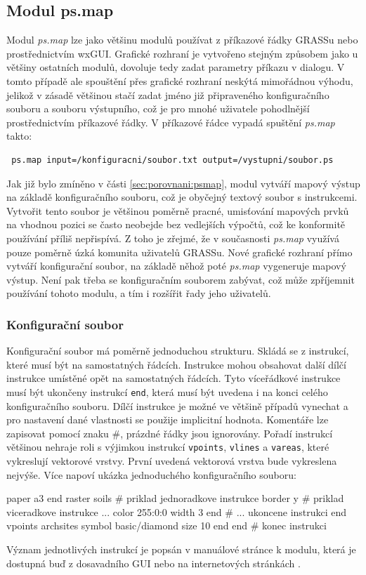 \documentclass[a4paper,12pt,draft]{article}
\newcommand{\modul}[1]{\emph{#1}}
\newcommand{\instr}[1]{\lstinline[style=psmapInline]|#1|}
\begin{document}
\subsection{Modul ps.map}
\label{sec:psmap}
Modul \modul{ps.map} lze jako většinu modulů používat z příkazové řádky GRASSu nebo pro\-střed\-nic\-tvím wxGUI. Grafické rozhraní je vytvořeno stejným způsobem jako u většiny ostatních modulů, dovoluje tedy zadat parametry příkazu v dialogu. V tomto případě ale spouštění přes grafické rozhraní neskýtá mimořádnou výhodu, jelikož v zásadě většinou stačí zadat jméno již připraveného konfiguračního souboru a souboru výstupního, což je pro mnohé uživatele pohodlnější prostřednictvím příkazové řádky. V příkazové řádce vypadá spuštění \modul{ps.map} takto:
\begin{verbatim}
 ps.map input=/konfiguracni/soubor.txt output=/vystupni/soubor.ps   
\end{verbatim}

Jak již bylo zmíněno v části \ref{sec:porovnani:psmap}, modul vytváří mapový výstup na základě konfiguračního souboru, což je obyčejný textový soubor s instrukcemi. Vytvořit tento soubor je většinou poměrně pracné, umisťování mapových prvků na vhodnou pozici se často neobejde bez vedlejších výpočtů, což ke konformitě používání příliš nepřispívá. Z toho je zřejmé, že v současnosti \modul{ps.map} využívá pouze poměrně úzká komunita uživatelů GRASSu. Nové grafické rozhraní přímo vytváří konfigurační soubor, na základě něhož poté \modul{ps.map} vygeneruje mapový výstup. Není pak třeba se konfiguračním souborem zabývat, což může zpříjemnit používání tohoto modulu, a tím i rozšířit řady jeho uživatelů. 

\subsubsection{Konfigurační soubor}
Konfigurační soubor má poměrně jednoduchou strukturu. Skládá se z instrukcí, které musí být na samostatných řádcích. Instrukce mohou obsahovat další dílčí instrukce umístěné opět na samostatných řádcích. Tyto víceřádkové instrukce musí být ukončeny  instrukcí \instr{end}, která musí být uvedena i na konci celého konfiguračního souboru. Dílčí instrukce je možné ve většině případů vynechat a pro nastavení dané vlastnosti se použije implicitní hodnota. Komentáře lze zapisovat pomocí znaku \#, prázdné řádky jsou ignorovány. Pořadí instrukcí většinou nehraje roli s výjimkou instrukcí \instr{vpoints}, \instr{vlines} a \instr{vareas}, které vykreslují vektorové vrstvy. První uvedená vektorová vrstva bude vykreslena nejvýše. Více napoví ukázka jednoduchého konfiguračního souboru:
\begin{psmap}
paper a3
end
raster soils            # priklad jednoradkove instrukce
border y                # priklad viceradkove instrukce ...
   color 255:0:0
   width 3
end                     # ... ukoncene instrukci end
vpoints archsites
   symbol basic/diamond
   size 10
end
end                     # konec instrukci
\end{psmap}
Význam jednotlivých instrukcí je popsán v manuálové stránce k modulu, která je dostupná buď z dosavadního GUI nebo na internetových stránkách \cite{manual}.
\end{document}
